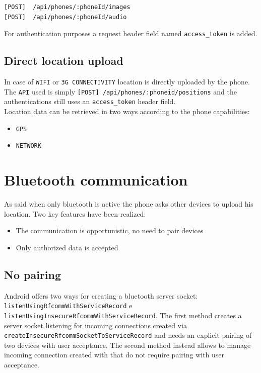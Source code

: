 \documentclass[conference, 11pt]{IEEEtran}
\begin{document}
\begin{lstlisting}[caption=REST API to upload images and audio]
[POST]	/api/phones/:phoneId/images
[POST] 	/api/phones/:phoneId/audio
\end{lstlisting}

For authentication purposes a request header field named \texttt{access\_token} is added.

\subsection{\textbf{Direct location upload}}
In case of \texttt{WIFI} or \texttt{3G CONNECTIVITY} location is directly uploaded by the phone. The \texttt{API} used is simply \texttt{[POST] /api/phones/:phoneid/positions} and the authentications still uses an \texttt{access\_token} header field.\\
Location data can be retrieved in two ways according to the phone capabilities:\\

\begin{itemize}
	\item \texttt{GPS}
	\item \texttt{NETWORK}
\end{itemize}

\section{\textbf{Bluetooth communication}}
As said when only bluetooth is active the phone asks other devices to upload his location. Two key features have been realized:\\

\begin{itemize}
	\item The communication is opportunistic, no need to pair devices
	\item Only authorized data is accepted\\
\end{itemize}

\subsection{\textbf{No pairing}}
Android offers two ways for creating a bluetooth server socket: \texttt{listen\allowbreak Using\allowbreak Rfcomm\allowbreak WithServiceRecord} e \texttt{listen\allowbreak Using\allowbreak Insecure\allowbreak RfcommWithServiceRecord}. The first method creates a server socket listening for incoming connections created via \texttt{create\allowbreak Insecure\allowbreak Rfcomm\allowbreak SocketToServiceRecord} and needs an explicit pairing of two devices with user acceptance. The second method instead allows to manage incoming connection created with \texttt{} that do not require pairing with user acceptance.\\
\end{document}
